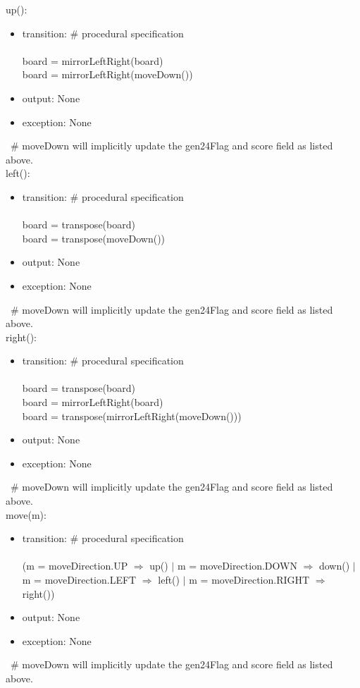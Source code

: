 \documentclass[12pt]{article}
\begin{document}
\noindent up():
\begin{itemize}
\item transition: \# procedural specification\\\\
board = mirrorLeftRight(board)\\
board = mirrorLeftRight(moveDown())
\item output: None
\item exception: None
\end{itemize}
~\noindent \# moveDown will implicitly update the gen24Flag and score field as listed above.\\

\noindent left():
\begin{itemize}
\item transition: \# procedural specification\\\\
board = transpose(board)\\
board = transpose(moveDown())
\item output: None
\item exception: None
\end{itemize}
~\noindent \# moveDown will implicitly update the gen24Flag and score field as listed above.\\

\noindent right():
\begin{itemize}
\item transition: \# procedural specification\\\\
board = transpose(board)\\
board = mirrorLeftRight(board)\\
board = transpose(mirrorLeftRight(moveDown()))
\item output: None
\item exception: None
\end{itemize}
~\noindent \# moveDown will implicitly update the gen24Flag and score field as listed above.\\

\noindent move(m):
\begin{itemize}
\item transition: \# procedural specification\\\\
(m = moveDirection.UP $\Rightarrow$ up() $\mid$ m = moveDirection.DOWN $\Rightarrow$ down() $\mid$ m = moveDirection.LEFT $\Rightarrow$ left() $\mid$ m = moveDirection.RIGHT $\Rightarrow$ right())
\item output: None
\item exception: None
\end{itemize}
~\noindent \# moveDown will implicitly update the gen24Flag and score field as listed above.\\
\end{document}

